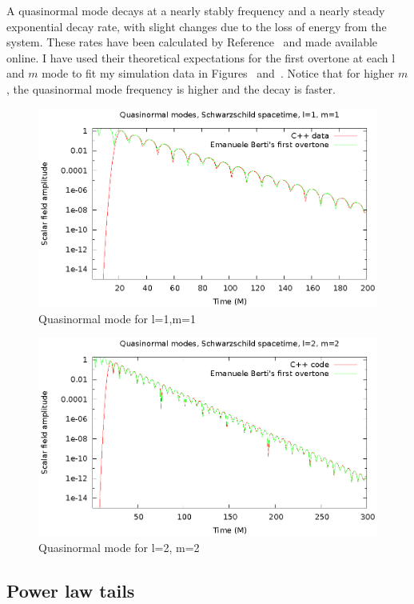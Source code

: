A quasinormal mode decays at a nearly stably frequency and a nearly steady exponential decay rate, with slight changes due to the loss of energy from the system. These rates have been calculated by Reference~\cite{bertiSchwQNM} and made available online. I have used their theoretical expectations for the first overtone at each l and $m$ mode to fit my simulation data in Figures~\cite{qnml1m1} and~\cite{qnml2m2}. Notice that for higher $m$, the quasinormal mode frequency is higher and the decay is faster.

\begin{figure}
  \includegraphics{l1m1qnm}
  \caption{Quasinormal mode for l=1,m=1}
  \label{qnml1m1}
\end{figure}

\begin{figure}
  \includegraphics{l2m2qnm}
  \caption{Quasinormal mode for l=2, m=2}
  \label{qnml2m2}
\end{figure}


\subsection{Power law tails}

